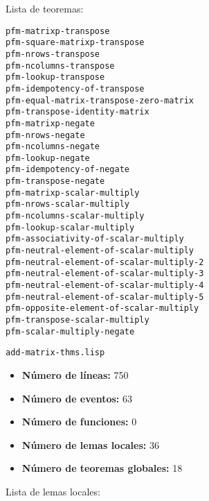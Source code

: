 \documentclass[a4paper,10pt]{article}
\begin{document}
\par \vspace{10pt}

Lista de teoremas:

\par \vspace{10pt}

\begin{lstlisting}[language=clips]
pfm-matrixp-transpose
pfm-square-matrixp-transpose
pfm-nrows-transpose
pfm-ncolumns-transpose
pfm-lookup-transpose
pfm-idempotency-of-transpose
pfm-equal-matrix-transpose-zero-matrix
pfm-transpose-identity-matrix
pfm-matrixp-negate
pfm-nrows-negate
pfm-ncolumns-negate
pfm-lookup-negate
pfm-idempotency-of-negate
pfm-transpose-negate
pfm-matrixp-scalar-multiply
pfm-nrows-scalar-multiply
pfm-ncolumns-scalar-multiply
pfm-lookup-scalar-multiply  
pfm-associativity-of-scalar-multiply
pfm-neutral-element-of-scalar-multiply
pfm-neutral-element-of-scalar-multiply-2
pfm-neutral-element-of-scalar-multiply-3
pfm-neutral-element-of-scalar-multiply-4
pfm-neutral-element-of-scalar-multiply-5
pfm-opposite-element-of-scalar-multiply  
pfm-transpose-scalar-multiply 
pfm-scalar-multiply-negate
\end{lstlisting}

\par \vspace{24pt}
\texttt{add-matrix-thms.lisp}

\par \vspace{10pt}

\begin{itemize}
	\item \textbf{Número de líneas:} 750
	\item \textbf{Número de eventos:} 63
	\item \textbf{Número de funciones:} 0
	\item \textbf{Número de lemas locales:} 36
	\item \textbf{Número de teoremas globales:} 18
\end{itemize}

\par \vspace{10pt}

Lista de lemas locales:

\par \vspace{10pt}
\end{document}
